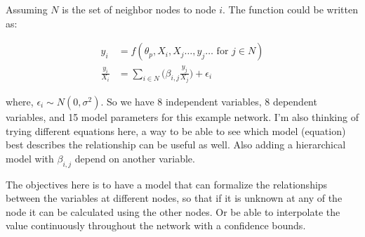 \documentclass[twoside,12pt,a4paper]{article}
\begin{document}

Assuming \(N\) is the set of neighbor nodes to node \(i\). The function could be written as:

\begin{align*}
  y_i &= f(\theta_p, X_i, X_j \hdots, y_j \hdots {\text{ for } j \in N})\\
  \frac{y_i}{X_i} &= \sum_{i \in N} \biggl( \beta_{i,j} \frac{y_j}{X_j}\biggr) + \epsilon_i 
\end{align*}

where, \(\epsilon_i \sim N(0, \sigma^2)\). So we have 8 independent variables, 8 dependent variables, and 15 model parameters for this example network. I'm also thinking of trying different equations here, a way to be able to see which model (equation) best describes the relationship can be useful as well. Also adding a hierarchical model with \(\beta_{i,j}\) depend on another variable.

The objectives here is to have a model that can formalize the relationships between the variables at different nodes, so that if it is unknown at any of the node it can be calculated using the other nodes. Or be able to interpolate the value continuously throughout the network with a confidence bounds.
\end{document}
